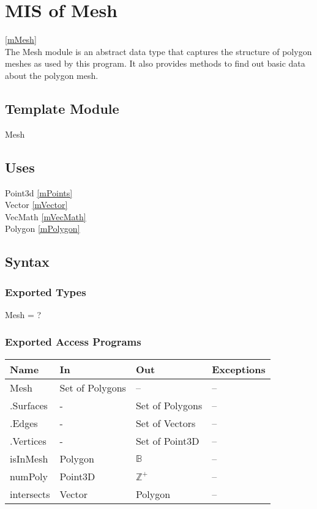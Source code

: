 \documentclass[12pt, titlepage]{article}
\begin{document}

\section{MIS of Mesh} \ref{mMesh} \\
The Mesh module is an abstract data type that captures the structure of polygon 
meshes as used by this program. It also provides methods to find out basic data 
about the polygon mesh.

\subsection{Template Module}
Mesh

\subsection{Uses}
Point3d \ref{mPoints} \\
Vector \ref{mVector}\\
VecMath \ref{mVecMath}\\
Polygon \ref{mPolygon}\\

\subsection{Syntax}
\subsubsection{Exported Types}
Mesh = ?

\subsubsection{Exported Access Programs}
\begin{center}
	\begin{tabular}{p{4cm} p{2cm} p{2cm} p{4cm}}
		\hline
		\textbf{Name} & \textbf{In} & \textbf{Out} & \textbf{Exceptions} \\
		\hline
		Mesh & Set of Polygons & -- & -- \\
		.Surfaces & - & Set of Polygons & -- \\
		.Edges & - & Set of Vectors & -- \\
		.Vertices & - & Set of Point3D & -- \\
		isInMesh & Polygon & $\mathbb{B}$ & -- \\ %
		numPoly & Point3D & $\mathbb{Z^+}$ & -- \\ %
		intersects & Vector & Polygon & -- \\ %
		\hline
	\end{tabular}
\end{center}
\end{document}
